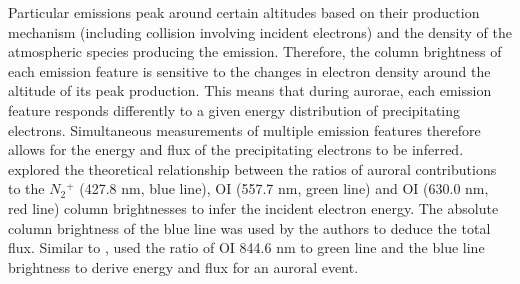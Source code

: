 


Particular emissions peak around certain altitudes based on their production mechanism (including collision involving incident electrons) and the density of the atmospheric species producing the emission. Therefore, the column brightness of each emission feature is sensitive to the changes in electron density around the altitude of its peak production. This means that during aurorae, each emission feature responds differently to a given energy distribution of precipitating electrons. %
Simultaneous measurements of multiple emission features therefore allows for the energy and flux of the precipitating electrons to be inferred. \citet{rees_1974} explored the theoretical relationship between the ratios of auroral contributions to the $N{_2}{^+}$ (427.8 nm, blue line), OI (557.7 nm, green line) and OI (630.0 nm, red line) column brightnesses to infer the incident electron energy. The absolute column brightness of the blue line was used by the authors to deduce the total flux. Similar to \citet{rees_1974}, \citet{grubbs_compare} used the ratio of OI 844.6 nm to green line and the blue line brightness to derive energy and flux for an auroral event.

